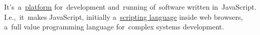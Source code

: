 \label{nodejs}
It's~a~\hyperref[platform]{platform} for~development and~running of~software written in~JavaScript.
I.e.,~it~makes JavaScript, initially a~\hyperref[scriptinglanguages]{scripting language} inside web browsers, a~full value programming language for~complex systems development.

